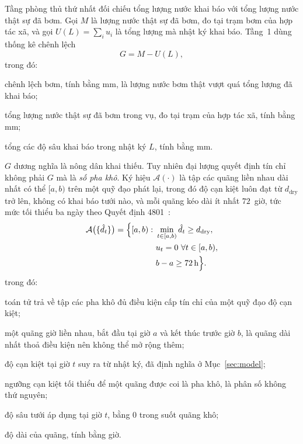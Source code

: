 Tầng phòng thủ thứ nhất đối chiếu tổng lượng nước khai báo với tổng lượng nước
thật sự đã bơm. Gọi $M$ là lượng nước thật sự đã bơm, đo tại trạm bơm của hợp tác
xã, và gọi $U(L)=\sum_i u_i$ là tổng lượng mà nhật ký khai báo. Tầng~1 dùng thống
kê chênh lệch
\begin{equation}
G=M-U(L),
\label{eq:gap}
\end{equation}
trong đó:
\begin{symbolist}
\item[$G$] chênh lệch bơm, tính bằng mm, là lượng nước bơm thật vượt quá tổng
  lượng đã khai báo;
\item[$M$] tổng lượng nước thật sự đã bơm trong vụ, đo tại trạm của hợp tác xã,
  tính bằng mm;
\item[$U(L)$] tổng các độ sâu khai báo trong nhật ký $L$, tính bằng mm.
\end{symbolist}

$G$ dương nghĩa là nông dân khai thiếu. Tuy nhiên đại lượng quyết định tín chỉ
không phải $G$ mà là \emph{số pha khô}. Ký hiệu
$\mathcal{A}(\cdot)$ là tập các quãng liền nhau dài nhất có thể $[a,b)$ trên một
quỹ đạo phát lại, trong đó độ cạn kiệt luôn đạt từ $d_{\mathrm{dry}}$ trở lên,
không có khai báo tưới nào, và mỗi quãng kéo dài ít nhất $72$~giờ, tức mức tối thiểu ba ngày theo
Quyết định 4801~\cite{qd4801}:
\begin{equation}
\begin{aligned}
\mathcal{A}\bigl(\{\hat d_t\}\bigr)=\Bigl\{[a,b):\ &\min_{t\in[a,b)}
\hat d_t\ge d_{\mathrm{dry}},\\
&u_t=0\ \forall t\in[a,b),\\
&b-a\ge 72\,\mathrm{h}\Bigr\}.
\end{aligned}
\label{eq:awd}
\end{equation}
trong đó:
\begin{symbolist}
\item[$\mathcal{A}(\cdot)$] toán tử trả về tập các pha khô đủ điều kiện cấp tín
  chỉ của một quỹ đạo độ cạn kiệt;
\item[$[a,b)$] một quãng giờ liền nhau, bắt đầu tại giờ $a$ và kết thúc trước giờ
  $b$, là quãng dài nhất thoả điều kiện nên không thể mở rộng thêm;
\item[$\hat d_t$] độ cạn kiệt tại giờ $t$ suy ra từ nhật ký, đã định nghĩa ở
  Mục~\ref{sec:model};
\item[$d_{\mathrm{dry}}$] ngưỡng cạn kiệt tối thiểu để một quãng được coi là pha
  khô, là phân số không thứ nguyên;
\item[$u_t$] độ sâu tưới áp dụng tại giờ $t$, bằng 0 trong suốt quãng khô;
\item[$b-a$] độ dài của quãng, tính bằng giờ.
\end{symbolist}

